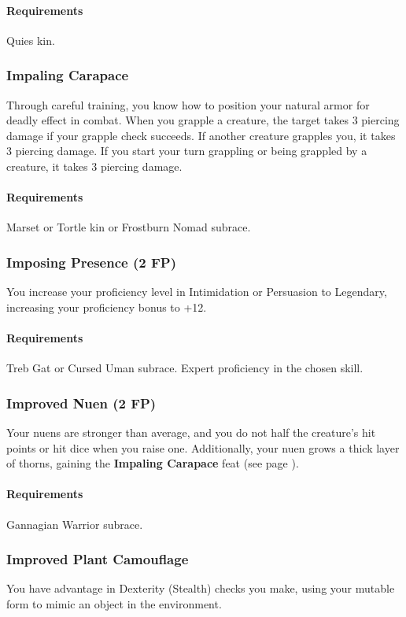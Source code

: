     \paragraph{Requirements} Quies kin.
\subsubsection{Impaling Carapace} \label{feat::impalingcarapace}
    Through careful training, you know how to position your natural armor for deadly effect in combat.
    When you grapple a creature, the target takes 3 piercing damage if your grapple check succeeds.
    If another creature grapples you, it takes 3 piercing damage.
    If you start your turn grappling or being grappled by a creature, it takes 3 piercing damage.
    \paragraph{Requirements} Marset or Tortle kin or Frostburn Nomad subrace.
\subsubsection{Imposing Presence (2 FP)} \label{feat::imposingpresence}
    You increase your proficiency level in Intimidation or Persuasion to Legendary, increasing your proficiency bonus to +12.
    \paragraph{Requirements} Treb Gat or Cursed Uman subrace. Expert proficiency in the chosen skill.
\subsubsection{Improved Nuen (2 FP)} \label{feat::improvednuen}
    Your nuens are stronger than average, and you do not half the creature's hit points or hit dice when you raise one.
    Additionally, your nuen grows a thick layer of thorns, gaining the \textbf{Impaling Carapace} feat (see page \pageref{feat::impalingcarapace}).
    \paragraph{Requirements} Gannagian Warrior subrace.
\subsubsection{Improved Plant Camouflage} \label{feat::improvedplantcamouflage}
    You have advantage in Dexterity (Stealth) checks you make, using your mutable form to mimic an object in the environment.
